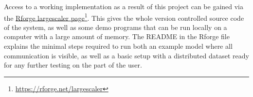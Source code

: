 Access to a working implementation as a result of this project can be gained via the \href{https://rforge.net/largescaler}{Rforge largescaler page}\footnote{\url{https://rforge.net/largescaler}}.
This gives the whole version controlled source code of the system, as well as some demo programs that can be run locally on a computer with a large amount of memory.
The \textsc{README} in the \lsr{} Rforge file explains the minimal steps required to run both an example model where all communication is visible, as well as a basic setup with a distributed dataset ready for any further testing on the part of the user.
